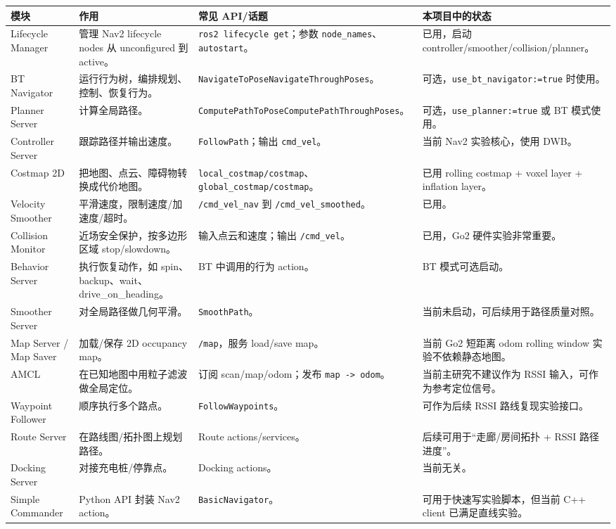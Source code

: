 \documentclass[UTF8,11pt,a4paper,openany]{ctexrep}
\newcommand{\code}[1]{\nolinkurl{#1}}
\newcommand{\topic}[1]{\nolinkurl{#1}}
\newcommand{\param}[1]{\nolinkurl{#1}}
\newcommand{\actionname}[1]{\nolinkurl{#1}}
\begin{document}
\begin{scriptsize}
\begin{longtable}{L{0.17\textwidth}L{0.28\textwidth}L{0.26\textwidth}L{0.21\textwidth}}
\toprule
模块 & 作用 & 常见 API/话题 & 本项目中的状态 \\
\midrule
Lifecycle Manager & 管理 Nav2 lifecycle nodes 从 unconfigured 到 active。 & \code{ros2 lifecycle get}；参数 \param{node_names}、\param{autostart}。 & 已用，启动 controller/smoother/collision/planner。 \\
BT Navigator & 运行行为树，编排规划、控制、恢复行为。 & \actionname{NavigateToPose}\newline \actionname{NavigateThroughPoses}。 & 可选，\param{use_bt_navigator:=true} 时使用。 \\
Planner Server & 计算全局路径。 & \actionname{ComputePathToPose}\newline \actionname{ComputePathThroughPoses}。 & 可选，\param{use_planner:=true} 或 BT 模式使用。 \\
Controller Server & 跟踪路径并输出速度。 & \actionname{FollowPath}；输出 \topic{cmd_vel}。 & 当前 Nav2 实验核心，使用 DWB。 \\
Costmap 2D & 把地图、点云、障碍物转换成代价地图。 & \topic{local_costmap/costmap}、\topic{global_costmap/costmap}。 & 已用 rolling costmap + voxel layer + inflation layer。 \\
Velocity Smoother & 平滑速度，限制速度/加速度/超时。 & \topic{/cmd_vel_nav} 到 \topic{/cmd_vel_smoothed}。 & 已用。 \\
Collision Monitor & 近场安全保护，按多边形区域 stop/slowdown。 & 输入点云和速度；输出 \topic{/cmd_vel}。 & 已用，Go2 硬件实验非常重要。 \\
Behavior Server & 执行恢复动作，如 spin、backup、wait、drive\_on\_heading。 & BT 中调用的行为 action。 & BT 模式可选启动。 \\
Smoother Server & 对全局路径做几何平滑。 & \actionname{SmoothPath}。 & 当前未启动，可后续用于路径质量对照。 \\
Map Server / Map Saver & 加载/保存 2D occupancy map。 & \topic{/map}，服务 load/save map。 & 当前 Go2 短距离 odom rolling window 实验不依赖静态地图。 \\
AMCL & 在已知地图中用粒子滤波做全局定位。 & 订阅 scan/map/odom；发布 \topic{map -> odom}。 & 当前主研究不建议作为 RSSI 输入，可作为参考定位信号。 \\
Waypoint Follower & 顺序执行多个路点。 & \actionname{FollowWaypoints}。 & 可作为后续 RSSI 路线复现实验接口。 \\
Route Server & 在路线图/拓扑图上规划路径。 & Route actions/services。 & 后续可用于“走廊/房间拓扑 + RSSI 路径进度”。 \\
Docking Server & 对接充电桩/停靠点。 & Docking actions。 & 当前无关。 \\
Simple Commander & Python API 封装 Nav2 action。 & \code{BasicNavigator}。 & 可用于快速写实验脚本，但当前 C++ client 已满足直线实验。 \\
\bottomrule
\end{longtable}
\end{scriptsize}
\end{document}

